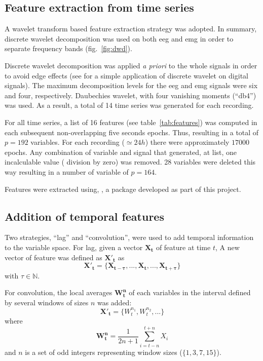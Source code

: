 \subsection{Feature extraction from time series}
\label{sub:features}

A wavelet transform based feature extraction strategy was adopted.
In summary, discrete wavelet decomposition was used on both \gls{eeg} and \gls{emg}
in order to separate frequency bands (fig.~\ref{fig:dwd}).



Discrete wavelet decomposition was applied \emph{a priori} to the whole signals
in order to avoid edge effects (see \cite{prabhakar_application_2002} for a
simple application of discrete wavelet on digital signals).
The maximum decomposition levels for the \gls{eeg} and \gls{emg} signals were six and four, respectively.
Daubechies wavelet, with four vanishing moments (``db4'') was used.
As a result, a total of 14 time series was generated for each recording.

For all time series, a list of 16 features (see table~\ref{tab:features}) was computed in each subsequent non-overlapping five seconds epochs.
Thus, resulting in a total of $p=192$ variables. 
For each recording ($\simeq 24h$) there were approximately $17000$ epochs.
Any combination of variable and signal that generated, at list, one incalculable value (\eg{} division by zero) was removed.
28 variables were deleted this way resulting in a number of variable of $p=164$.



Features were extracted using, \pr{}, a \py{} package developed as part of this project.


\subsection{Addition of temporal features}
Two strategies, ``lag'' and ``convolution'', were used to add temporal
information to the variable space\cite{dietterich_machine_2002}.
For lag, given a vector $\mathbf{X_t}$ of feature at time $t$,
A new vector of feature was defined as $\mathbf{{X'}_t}$ as
\begin{equation}
\mathbf{{X'}_t} = \{\mathbf{X_{t-\tau}}, ..., \mathbf{X_t}, ..., \mathbf{X_{t+\tau}}\}
\label{eq:tau}
\end{equation}
with $\tau \in \mathbb{N}$.

For convolution, the local averages $\mathbf{W^n_t}$ of each variables
in the interval defined by several windows of sizes $n$ was added:
\begin{equation}
\mathbf{{X'}_t} = \{W^{n_1}_t, W^{n_2}_t, ...\}
\label{eq:window}
\end{equation}
where
\[
\mathbf{W^n_t} = \frac{1}{2n+1} \sum_{i = t-n}^{t+n}{X_i}
\]
and $n$ is a set of odd integers representing window sizes (\eg $\{1,3,7,15\}$).



